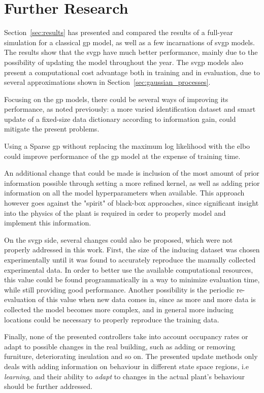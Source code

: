 \section{Further Research}

Section~\ref{sec:results} has presented and compared the results of a full-year
simulation for a classical \acrshort{gp} model, as well as a few incarnations of
\acrshort{svgp} models. The results show that the \acrshort{svgp} have much
better performance, mainly due to the possibility of updating the model
throughout the year. The \acrshort{svgp} models also present a computational
cost advantage both in training and in evaluation, due to several approximations
shown in Section~\ref{sec:gaussian_processes}.

Focusing on the \acrlong{gp} models, there could be several ways of improving
its performance, as noted previously: a more varied identification dataset and
smart update of a fixed-size data dictionary according to information gain,
could mitigate the present problems.

Using a Sparse \acrshort{gp} without replacing the maximum log likelihood
with the \acrshort{elbo} could improve performance of the \acrshort{gp} model at
the expense of training time.

An additional change that could be made is inclusion of the most amount of prior
information possible through setting a more refined kernel, as well as adding
prior information on all the model hyperparameters when available. This approach
however goes against the "spirit" of black-box approaches, since significant
insight into the physics of the plant is required in order to properly model and
implement this information.

On the \acrshort{svgp} side, several changes could also be proposed, which were
not properly addressed in this work. First, the size of the inducing dataset was
chosen experimentally until it was found to accurately reproduce the manually
collected experimental data. In order to better use the available computational
resources, this value could be found programmatically in a way to minimize
evaluation time, while still providing good performance. Another possibility is
the periodic re-evaluation of this value when new data comes in, since as more
and more data is collected the model becomes more complex, and in general more
inducing locations could be necessary to properly reproduce the training data.

Finally, none of the presented controllers take into account occupancy rates or
adapt to possible changes in the real building, such as adding or removing
furniture, deteriorating insulation and so on. The presented update methods only
deals with adding information on behaviour in different state space regions, i.e
\textit{learning}, and their ability to \textit{adapt} to changes in the actual
plant's behaviour should be further addressed.
